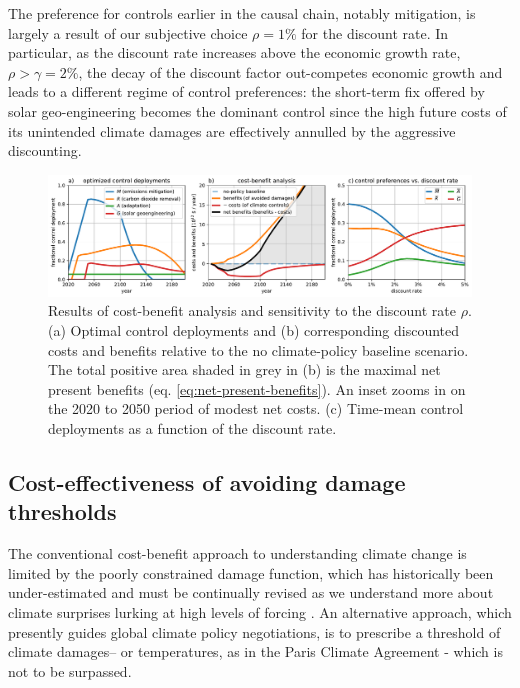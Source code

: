 \documentclass[9pt,twocolumn,twoside,lineno]{pnas-new}
\begin{document}
The preference for controls earlier in the causal chain, notably mitigation, is largely a result of our subjective choice $\rho = 1\%$ for the discount rate. In particular, as the discount rate increases above the economic growth rate, $\rho > \gamma = 2\%$, the decay of the discount factor out-competes economic growth and leads to a different regime of control preferences: the short-term fix offered by solar geo-engineering becomes the dominant control since the high future costs of its unintended climate damages are effectively annulled by the aggressive discounting.

\begin{figure}%
\centering
\includegraphics[width=17.8cm]{figures/default-benefits_controls_and_benefits.pdf}
\caption{Results of cost-benefit analysis and sensitivity to the discount rate $\rho$. (a) Optimal control deployments and (b) corresponding discounted costs and benefits relative to the no climate-policy baseline scenario. The total positive area shaded in grey in (b) is the maximal net present benefits (eq. \ref{eq:net-present-benefits}). An inset zooms in on the 2020 to 2050 period of modest net costs. (c) Time-mean control deployments as a function of the discount rate.}
\label{fig:cost-benefit}
\end{figure}

\subsection*{Cost-effectiveness of avoiding damage thresholds}\label{sec:cost-effectivness}

The conventional cost-benefit approach to understanding climate change is limited by the poorly constrained damage function, which has historically been under-estimated \cite{} and must be continually revised as we understand more about climate surprises lurking at high levels of forcing \citep{alley_abrupt_2003, sherwood_adaptability_2010, scher_carbonocean_2017}. An alternative approach, which presently guides global climate policy negotiations, is to prescribe a threshold of climate damages– or temperatures, as in the Paris Climate Agreement \cite{ParisAgreement2015} - which is not to be surpassed.
\end{document}
